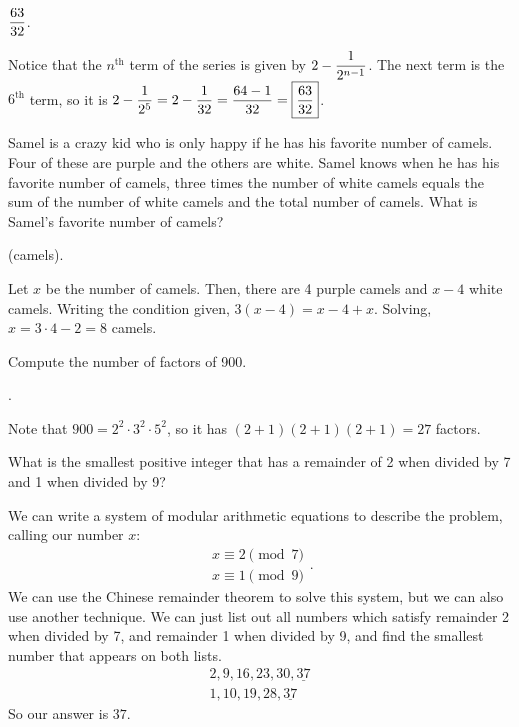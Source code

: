 \documentclass[11pt]{article}
\DeclareRobustCommand{\frac}[3][0pt]{%
  {\begingroup\hspace{#1}#2\hspace{#1}\endgroup\over\hspace{#1}#3\hspace{#1}}}
\begin{document}
\answer $\displaystyle \frac{63}{32}$.
\begin{solution}
Notice that the $n^{\text{th}}$ term of the series is given by $\displaystyle 2 - \frac{1}{2^{n-1}}$. The next term is the $6^{\text{th}}$ term, so it is $\displaystyle 2 - \frac{1}{2^{5}} = 2 - \frac{1}{32} = \frac{64 - 1}{32} = \boxed{\frac{63}{32}}$.
\end{solution}

\begin{problem} Samel is a crazy kid who is only happy if he has his favorite number of camels. Four of these are purple and the others are white. Samel knows when he has his favorite number of camels, three times the number of white camels equals the sum of the number of white camels and the total number of camels. What is Samel’s favorite number of camels?
\end{problem} 

 (camels).
\begin{solution}
Let $x$ be the number of camels. Then, there are 4 purple camels and $x - 4$ white camels. Writing the condition given, $3(x - 4) = x - 4 + x$. Solving, $x = 3 \cdot 4 - 2 = \boxed{8}$ camels.
\end{solution}

\begin{problem} Compute the number of factors of 900.
\end{problem}

.
\begin{solution}
Note that $900 = 2^2 \cdot 3^2 \cdot 5^2$, so it has $(2 + 1)(2 + 1)(2 + 1) = \boxed{27}$ factors.
\end{solution}


\begin{problem}What is the smallest positive integer that has a remainder of 2 when divided by 7 and 1 when divided by 9?
\end{problem}
\begin{answer}
\end{answer}
\begin{solution}
We can write a system of modular arithmetic equations to describe the problem, calling our number $x$:
$$ \begin{array}{ll}
                  x \equiv 2 \pmod{7}\\
                  x \equiv 1 \pmod{9} 
\end{array}.
$$
We can use the Chinese remainder theorem to solve this system, but we can also use another technique. We can just list out all numbers which satisfy remainder 2 when divided by 7, and remainder 1 when divided by 9, and find the smallest number that appears on both lists.
\begin{align*}
2, 9, 16, 23, 30, \underline{37} \\
1, 10, 19, 28, \underline{37}
\end{align*}
So our answer is $\boxed{37}$.
\end{solution}
\end{document}
